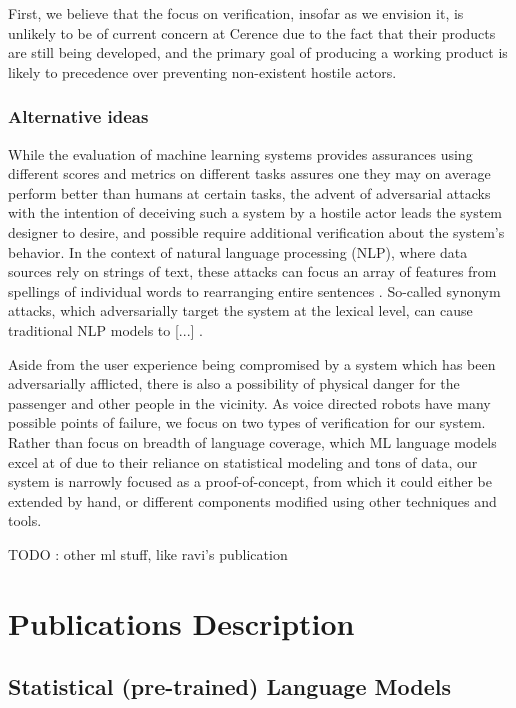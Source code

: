 \documentclass[a4paper, 11pt]{article}
\begin{document}
First, we believe that the focus on verification, insofar as we envision it, is
unlikely to be of current concern at Cerence due to the fact that their products
are still being developed, and the primary goal of producing a working product
is likely to precedence over preventing non-existent hostile actors.

\subsubsection{Alternative ideas}

While the evaluation of machine learning systems provides assurances using
different scores and metrics on different tasks assures one they may on average
perform better than humans at certain tasks, the advent of adversarial attacks
\cite{szegedy} with the intention of deceiving such a system by a hostile actor
leads the system designer to desire, and possible require additional
verification about the system's behavior. In the context of natural language
processing (NLP), where data sources rely on strings of text, these attacks can
focus an array of features from spellings of individual words to rearranging
entire sentences \cite{}. So-called synonym attacks, which adversarially target
the system at the lexical level, can cause traditional NLP models to [...]
\cite{}.


Aside from the user experience being compromised by a system which has been
adversarially afflicted, there is also a possibility of physical danger for the
passenger and other people in the vicinity. As voice directed robots have many
possible points of failure, we focus on two types of verification for our
system. Rather than focus on breadth of language coverage, which ML language
models excel at of due to their reliance on statistical modeling and tons
of data, our system is narrowly focused as a proof-of-concept, from which it
could either be extended by hand, or different components modified using
other techniques and tools.

TODO : other ml stuff, like ravi's publication

\section{Publications Description}

\subsection{Statistical (pre-trained) Language Models}
\end{document}

